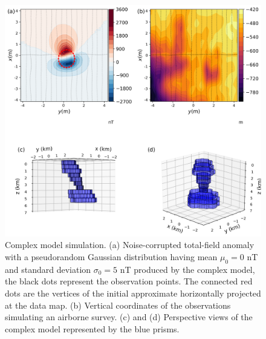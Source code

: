 \begin{figure}
    \centering
    \includegraphics[width=\linewidth]{figures/complex_model_data.png}
    \caption{Complex model simulation. (a) Noise-corrupted total-field anomaly with a pseudorandom Gaussian distribution having mean $\mu_0 = 0$ nT and standard deviation $\sigma_0 = 5$ nT produced by the complex model, the black dots represent the observation points. The connected red dots are the vertices of the initial approximate horizontally projected at the data map. (b) Vertical coordinates of the observations  simulating an airborne survey. (c) and (d) Perspective views of the complex model represented by the blue prisms.
}
    \label{fig:complex_model}
\end{figure}

